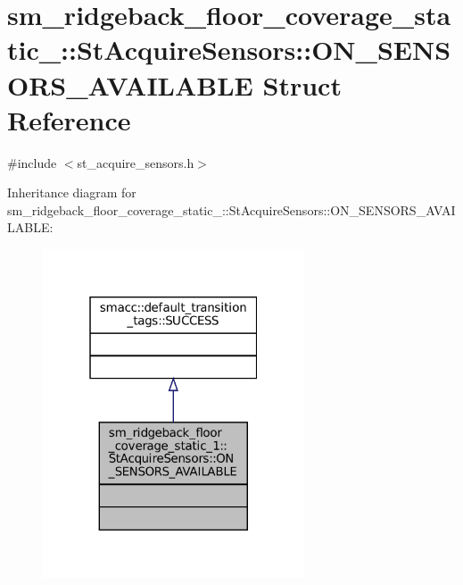 \hypertarget{structsm__ridgeback__floor__coverage__static__1_1_1StAcquireSensors_1_1ON__SENSORS__AVAILABLE}{}\section{sm\+\_\+ridgeback\+\_\+floor\+\_\+coverage\+\_\+static\+\_\+:\+:St\+Acquire\+Sensors\+:\+:O\+N\+\_\+\+S\+E\+N\+S\+O\+R\+S\+\_\+\+A\+V\+A\+I\+L\+A\+B\+LE Struct Reference}
\label{structsm__ridgeback__floor__coverage__static__1_1_1StAcquireSensors_1_1ON__SENSORS__AVAILABLE}


{\ttfamily \#include $<$st\+\_\+acquire\+\_\+sensors.\+h$>$}



Inheritance diagram for sm\+\_\+ridgeback\+\_\+floor\+\_\+coverage\+\_\+static\+\_\+:\+:St\+Acquire\+Sensors\+:\+:O\+N\+\_\+\+S\+E\+N\+S\+O\+R\+S\+\_\+\+A\+V\+A\+I\+L\+A\+B\+LE\+:
\nopagebreak
\begin{figure}[H]
\begin{center}
\leavevmode
\includegraphics[width=220pt]{structsm__ridgeback__floor__coverage__static__1_1_1StAcquireSensors_1_1ON__SENSORS__AVAILABLE__inherit__graph}
\end{center}
\end{figure}


